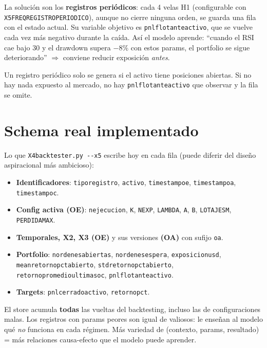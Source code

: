 \documentclass[11pt,a4paper]{report}
\newcommand{\code}[1]{\texttt{\def\_{\textunderscore\allowbreak}#1}}
\begin{document}
La solución son los \textbf{registros periódicos}: cada 4 velas H1 (configurable con
\code{X5\_FREQ\_REGISTRO\_PERIODICO}), aunque no cierre ninguna orden, se guarda una fila con el
estado actual. Su variable objetivo es \code{pnl\_flotante\_activo}, que se vuelve cada vez más
negativo durante la caída. Así el modelo aprende: ``cuando el RSI cae bajo 30 y el drawdown supera
$-8\%$ con estos params, el portfolio se sigue deteriorando'' $\Rightarrow$ conviene reducir
exposición \emph{antes}.

\begin{nota}
Un registro periódico solo se genera si el activo tiene posiciones abiertas. Si no hay nada
expuesto al mercado, no hay \code{pnl\_flotante\_activo} que observar y la fila se omite.
\end{nota}

\section{Schema real implementado}

Lo que \code{X4\_backtester.py -{}-x5} escribe hoy en cada fila (puede diferir del diseño
aspiracional más ambicioso):

\begin{itemize}[itemsep=1pt, leftmargin=1.4em]
  \item \textbf{Identificadores}: \code{tipo\_registro}, \code{activo}, \code{timestamp\_oe},
  \code{timestamp\_oa}, \code{timestamp\_oc}.
  \item \textbf{Config activa (OE)}: \code{n\_ejecucion}, \code{K}, \code{N\_EXP}, \code{LAMBDA},
  \code{A}, \code{B}, \code{LOTAJES\_M}, \code{PERDIDA\_MAX}.
  \item \textbf{Temporales, X2, X3 (OE)} y sus versiones \textbf{(OA)} con sufijo \code{\_oa}.
  \item \textbf{Portfolio}: \code{n\_ordenes\_abiertas}, \code{n\_ordenes\_espera},
  \code{exposicion\_usd}, \code{mean\_retorno\_pct\_abierto}, \code{std\_retorno\_pct\_abierto},
  \code{retorno\_promedio\_ultimas\_5\_oc}, \code{pnl\_flotante\_activo}.
  \item \textbf{Targets}: \code{pnl\_cerrado\_activo}, \code{retorno\_pct}.
\end{itemize}

\begin{nota}
El store acumula \textbf{todas} las vueltas del backtesting, incluso las de configuraciones
malas. Los registros con params peores son igual de valiosos: le enseñan al modelo qué
\emph{no} funciona en cada régimen. Más variedad de (contexto, params, resultado) = más
relaciones causa-efecto que el modelo puede aprender.
\end{nota}
\end{document}
